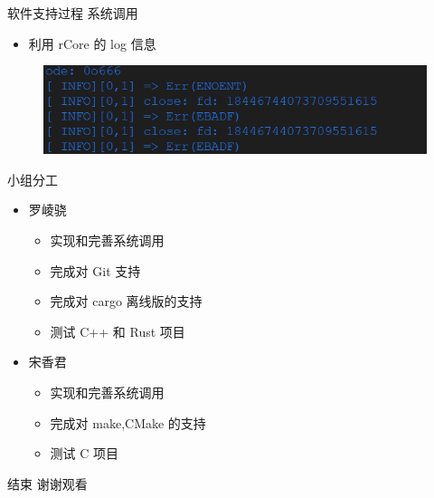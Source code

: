 \documentclass{beamer}
\begin{document}
\begin{frame}{软件支持过程}
    {系统调用}
    \begin{itemize}
        \item 利用 rCore 的 log 信息
    \end{itemize}
    \begin{figure}[H]
        \centering
        \includegraphics[width=\linewidth]{assets/syscall0.png}
    \end{figure}
\end{frame}
    
\begin{frame}{小组分工}
    \begin{itemize}
        \item 罗崚骁
        \begin{itemize}
            \setlength{\itemsep}{8pt}
            \item 实现和完善系统调用
            \item 完成对 Git 支持
            \item 完成对 cargo 离线版的支持
            \item 测试 C++ 和 Rust 项目
        \end{itemize}
        \item 宋香君
        \begin{itemize}
            \setlength{\itemsep}{8pt}
            \item 实现和完善系统调用
            \item 完成对 make,CMake 的支持
            \item 测试 C 项目
        \end{itemize}
    \end{itemize}
\end{frame}

\begin{frame}{结束}
    谢谢观看
\end{frame}
\end{document}

